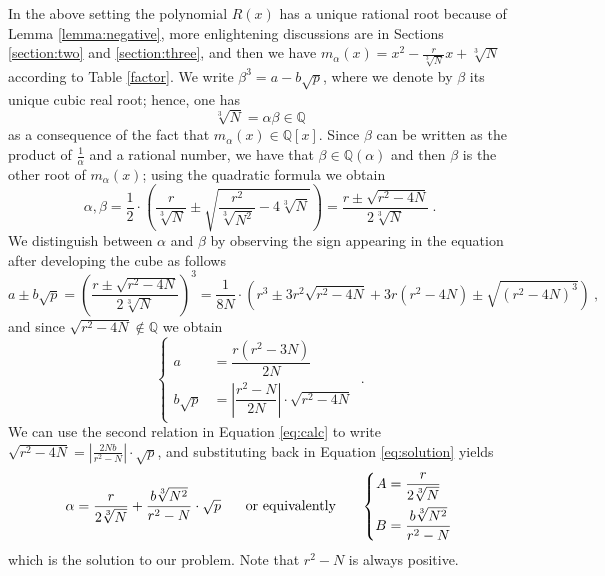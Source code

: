 \documentclass[11pt,a4paper]{article}
\numberwithin{equation}{section}
\newcommand{\Q}{\mathbb{Q}}
\theoremstyle{definition}
\begin{document}
In the above setting the polynomial $R(x)$ has a unique rational root because of Lemma \ref{lemma:negative}, more enlightening discussions are in Sections \ref{section:two} and \ref{section:three}, and then we have $m_\alpha(x)=x^2-\frac{r}{\sqrt[3]{N}}x+\sqrt[3]{N}$ according to Table \ref{factor}.
We write $\beta^3=a-b\sqrt p$, where we denote by $\beta$ its unique cubic real root; hence, one has \[\sqrt[3]{N}=\alpha\beta\in\Q\] as a consequence of the fact that $m_\alpha(x)\in\Q[x]$.
Since $\beta$ can be written as the product of $\frac{1}{\alpha}$ and a rational number, we have that $\beta\in\Q(\alpha)$ and then $\beta$ is the other root of $m_\alpha(x)$; using the quadratic formula we obtain \begin{equation}
\alpha,\beta=\dfrac{1}{2}\cdot\left(\dfrac{r}{\sqrt[3]{N}}\pm\sqrt{\dfrac{r^2}{\sqrt[3]{N^2}}-4\sqrt[3]{N}}\right)=\dfrac{r\pm\sqrt{r^2-4N}}{2\sqrt[3]{N}}\:.
\label{eq:solution}
\end{equation}
We distinguish between $\alpha$ and $\beta$ by observing the sign appearing in the equation after developing the cube as follows
\[a\pm b\sqrt p=\left(\dfrac{r\pm\sqrt{r^2-4N}}{2\sqrt[3]{N}}\right)^3=\dfrac{1}{8N}\cdot\left(r^3\pm3r^2\sqrt{r^2-4N}+3r(r^2-4N)\pm\sqrt{(r^2-4N)^3}\right)\:,\] and since $\sqrt{r^2-4N}\notin\Q$ we obtain
\begin{equation}
  \left\{\begin{aligned}
   a&=\dfrac{r(r^2-3N)}{2N} \\
   b\sqrt p&=\left|\dfrac{r^2-N}{2N}\right|\cdot\sqrt{r^2-4N}
\end{aligned}\right.\:.
\label{eq:calc}
\end{equation}
We can use the second relation in Equation \eqref{eq:calc} to write $\sqrt{r^2-4N}=\left|\frac{2Nb}{r^2-N}\right|\cdot\sqrt p$, and substituting back in Equation \eqref{eq:solution} yields \[\alpha=\dfrac{r}{2\sqrt[3]{N}}+\dfrac{b\sqrt[3]{N^2}}{r^2-N}\cdot\sqrt p\hspace{0.5cm}\text{ or equivalently }\hspace{0.5cm}\left\{\begin{aligned}
    A&=\dfrac{r}{2\sqrt[3]{N}} \\
    B&=\dfrac{b\sqrt[3]{N^2}}{r^2-N}
\end{aligned}\right.\] which is the solution to our problem. Note that $r^2-N$ is always positive.
\end{document}
